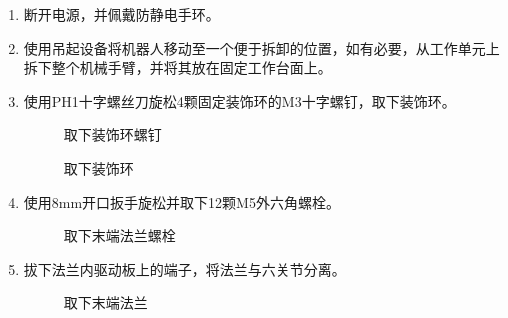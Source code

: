 \documentclass[a4paper,11pt,english,openany,oneside]{sphinxmanual}
\begin{document}
\sphinxAtStartPar
{}
\begin{enumerate}
%
\item {} 
\sphinxAtStartPar
断开电源，并佩戴防静电手环。

\item {} 
\sphinxAtStartPar
使用吊起设备将机器人移动至一个便于拆卸的位置，如有必要，从工作单元上拆下整个机械手臂，并将其放在固定工作台面上。

\item {} 
\sphinxAtStartPar
使用PH1十字螺丝刀旋松4颗固定装饰环的M3十字螺钉，取下装饰环。

\begin{figure}[H]
\centering
\capstart

\noindent{}
\caption{取下装饰环螺钉}\label{\detokenize{_u66f4_u6362_u672b_u7aef_u6cd5_u5170:id24}}\end{figure}

\begin{figure}[H]
\centering
\capstart

\noindent{}
\caption{取下装饰环}\label{\detokenize{_u66f4_u6362_u672b_u7aef_u6cd5_u5170:id25}}\end{figure}

\item {} 
\sphinxAtStartPar
使用8mm开口扳手旋松并取下12颗M5外六角螺栓。

\begin{figure}[H]
\centering
\capstart

\noindent{}
\caption{取下末端法兰螺栓}\label{\detokenize{_u66f4_u6362_u672b_u7aef_u6cd5_u5170:id26}}\end{figure}

\item {} 
\sphinxAtStartPar
拔下法兰内驱动板上的端子，将法兰与六关节分离。

\begin{figure}[H]
\centering
\capstart

\noindent{}
\caption{取下末端法兰}\label{\detokenize{_u66f4_u6362_u672b_u7aef_u6cd5_u5170:id27}}\end{figure}

\end{enumerate}
\end{document}
